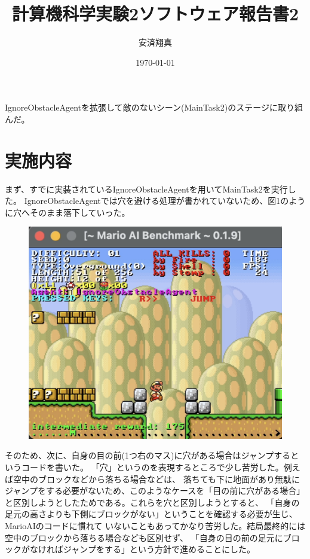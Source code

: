 \documentclass[a4paper,11pt]{jsarticle}
\begin{document}
\title{計算機科学実験2ソフトウェア報告書2}
\author{安済翔真}
\date{\today}
\maketitle

IgnoreObstacleAgentを拡張して敵のないシーン(MainTask2)のステージに取り組んだ。

\section*{実施内容}

まず、すでに実装されているIgnoreObstacleAgentを用いてMainTask2を実行した。
IgnoreObstacleAgentでは穴を避ける処理が書かれていないため、図1のように穴へそのまま落下していった。

\begin{figure}[h]
  \centering
  \includegraphics*[scale=0.3]{
    images/report2/ignore-obstacle-fail.png
  }
  \caption[図1]{}
\end{figure}

そのため、次に、自身の目の前(1つ右のマス)に穴がある場合はジャンプするというコードを書いた。
「穴」というのを表現するところで少し苦労した。例えば空中のブロックなどから落ちる場合などは、
落ちても下に地面があり無駄にジャンプをする必要がないため、このようなケースを「目の前に穴がある場合」
と区別しようとしたためである。これらを穴と区別しようとすると、
「自身の足元の高さよりも下側にブロックがない」ということを確認する必要が生じ、MarioAIのコードに慣れて
いないこともあってかなり苦労した。結局最終的には空中のブロックから落ちる場合なども区別せず、
「自身の目の前の足元にブロックがなければジャンプをする」という方針で進めることにした。
\end{document}
